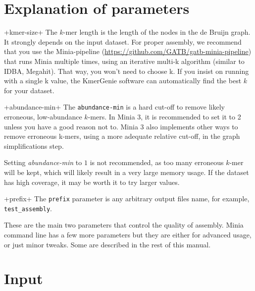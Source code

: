 \documentclass[a4paper]{article}
\begin{document}
\section{Explanation of parameters}
\begin{description}

\vitem+kmer-size+
        The $k$-mer length is the length of the nodes in the de Bruijn graph. It strongly depends on the input dataset. For proper assembly, we recommend that you use the Minia-pipeline (\url{https://github.com/GATB/gatb-minia-pipeline}) that runs Minia multiple times, using an iterative multi-k algorithm (similar to IDBA, Megahit). That way, you won't need to choose k. If you insist on running with a single k value, the KmerGenie software can automatically find the best $k$ for your dataset.

\vitem+abundance-min+
The \verb+abundance-min+ is a hard cut-off to remove likely erroneous, low-abundance $k$-mers. In Minia 3, it is recommended to set it to 2 unless you have a good reason not to. Minia 3 also implements other ways to remove erroneous k-mers, using a more adequate relative cut-off, in the graph simplifications step.

Setting \emph{abundance-min} to $1$ is not recommended, as too many erroneous $k$-mer will be kept, which will likely result in a very large memory usage. If the dataset has high coverage, it may be worth it to try larger values. 

\vitem+prefix+
The \verb+prefix+ parameter is any arbitrary output files name, for example, \verb+test_assembly+.

\end{description}

These are the main two parameters that control the quality of assembly. Minia command line has a few more parameters but they are either for advanced usage, or just minor tweaks. Some are described in the rest of this manual.


\section{Input}
\end{document}
